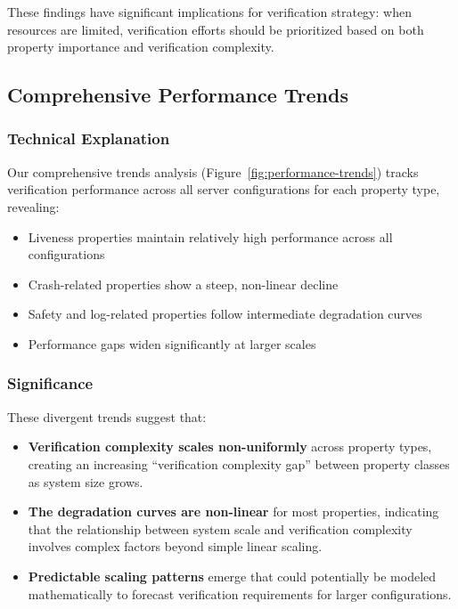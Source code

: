 These findings have significant implications for verification strategy: when resources are limited, verification efforts should be prioritized based on both property importance and verification complexity.

\subsection{Comprehensive Performance Trends}

\subsubsection{Technical Explanation}

Our comprehensive trends analysis (Figure~\ref{fig:performance-trends}) tracks verification performance across all server configurations for each property type, revealing:

\begin{itemize}
    \item Liveness properties maintain relatively high performance across all configurations
    \item Crash-related properties show a steep, non-linear decline
    \item Safety and log-related properties follow intermediate degradation curves
    \item Performance gaps widen significantly at larger scales
\end{itemize}

\subsubsection{Significance}

These divergent trends suggest that:

\begin{itemize}
    \item \textbf{Verification complexity scales non-uniformly} across property types, creating an increasing ``verification complexity gap'' between property classes as system size grows.
    
    \item \textbf{The degradation curves are non-linear} for most properties, indicating that the relationship between system scale and verification complexity involves complex factors beyond simple linear scaling.
    
    \item \textbf{Predictable scaling patterns} emerge that could potentially be modeled mathematically to forecast verification requirements for larger configurations.
\end{itemize}

